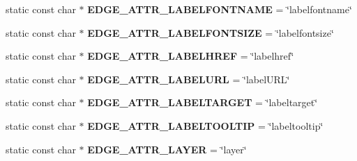 \begin{DoxyCompactItemize}
\item 
static const char $\ast$ {\bfseries E\+D\+G\+E\+\_\+\+A\+T\+T\+R\+\_\+\+L\+A\+B\+E\+L\+F\+O\+N\+T\+N\+A\+ME} = \char`\"{}labelfontname\char`\"{}\hypertarget{classmemgraph_1_1_graphviz_attrs_a1834dc41c7b1c6eddaf944e3cd4156d9}{}\label{classmemgraph_1_1_graphviz_attrs_a1834dc41c7b1c6eddaf944e3cd4156d9}

\item 
static const char $\ast$ {\bfseries E\+D\+G\+E\+\_\+\+A\+T\+T\+R\+\_\+\+L\+A\+B\+E\+L\+F\+O\+N\+T\+S\+I\+ZE} = \char`\"{}labelfontsize\char`\"{}\hypertarget{classmemgraph_1_1_graphviz_attrs_a35a02833a81fc219810363efa19472d5}{}\label{classmemgraph_1_1_graphviz_attrs_a35a02833a81fc219810363efa19472d5}

\item 
static const char $\ast$ {\bfseries E\+D\+G\+E\+\_\+\+A\+T\+T\+R\+\_\+\+L\+A\+B\+E\+L\+H\+R\+EF} = \char`\"{}labelhref\char`\"{}\hypertarget{classmemgraph_1_1_graphviz_attrs_a8507bcdcef20b8fe6e8b4fd03bd5e02b}{}\label{classmemgraph_1_1_graphviz_attrs_a8507bcdcef20b8fe6e8b4fd03bd5e02b}

\item 
static const char $\ast$ {\bfseries E\+D\+G\+E\+\_\+\+A\+T\+T\+R\+\_\+\+L\+A\+B\+E\+L\+U\+RL} = \char`\"{}label\+U\+RL\char`\"{}\hypertarget{classmemgraph_1_1_graphviz_attrs_acf65e460854b1a8931edc16dc21217e0}{}\label{classmemgraph_1_1_graphviz_attrs_acf65e460854b1a8931edc16dc21217e0}

\item 
static const char $\ast$ {\bfseries E\+D\+G\+E\+\_\+\+A\+T\+T\+R\+\_\+\+L\+A\+B\+E\+L\+T\+A\+R\+G\+ET} = \char`\"{}labeltarget\char`\"{}\hypertarget{classmemgraph_1_1_graphviz_attrs_a890b74c4e322563e7c484a549da60227}{}\label{classmemgraph_1_1_graphviz_attrs_a890b74c4e322563e7c484a549da60227}

\item 
static const char $\ast$ {\bfseries E\+D\+G\+E\+\_\+\+A\+T\+T\+R\+\_\+\+L\+A\+B\+E\+L\+T\+O\+O\+L\+T\+IP} = \char`\"{}labeltooltip\char`\"{}\hypertarget{classmemgraph_1_1_graphviz_attrs_a1b9caaceb4cb03dbb6924606d76d09fd}{}\label{classmemgraph_1_1_graphviz_attrs_a1b9caaceb4cb03dbb6924606d76d09fd}

\item 
static const char $\ast$ {\bfseries E\+D\+G\+E\+\_\+\+A\+T\+T\+R\+\_\+\+L\+A\+Y\+ER} = \char`\"{}layer\char`\"{}\hypertarget{classmemgraph_1_1_graphviz_attrs_aa8d2b882e91809825a87bf6541c9b8f5}{}\label{classmemgraph_1_1_graphviz_attrs_aa8d2b882e91809825a87bf6541c9b8f5}


\end{DoxyCompactItemize}
